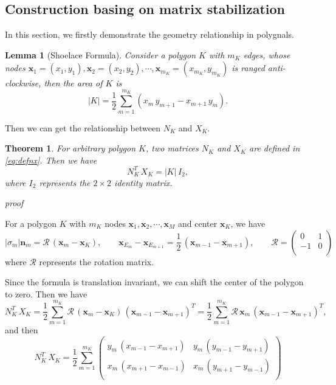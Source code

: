 \documentclass[times,review,preprint,authoryear]{elsarticle}
\newtheorem{theorem}{Theorem}
\newtheorem{lemma}{Lemma}
\newcommand{\bx}{\mathbf{x}}
\newcommand{\bn}{\mathbf{n}}
\begin{document}
\subsection{Construction basing on matrix stabilization}

In this section, we firstly demonstrate the geometry relationship in polygnals.

\begin{lemma}[Shoelace Formula]\label{lemma:K}
Consider a polygon $K$ with $m_K$ edges, whose nodes $\bx_1 = (x_1, y_1), \bx_2 = (x_2, y_2), \cdots, \bx_{m_K} = (x_{m_K}, y_{m_K})$ is ranged anti-clockwise, then the area of $K$ is
\begin{equation}
|K| = \frac12 \sum_{m=1}^{m_K} (x_{m} \, y_{m+1} - x_{m+1} \, y_{m}).
\end{equation}
\end{lemma}

Then we can get the relationship between $N_K$ and $X_K$.

\begin{theorem}
For arbitrary polygon $K$, two matrices $N_K$ and $X_K$ are defined in \cref{eq:defnx}. Then we have
\begin{equation}
N_K^T \, X_K = |K| \, I_2,
\end{equation}
where $I_2$ represents the $2 \times 2$ identity matrix.
\end{theorem}

\emph{proof}

For a polygon $K$ with $m_K$ nodes $\bx_1, \bx_2, \cdots, \bx_M$ and center $\bx_K$, we have
\begin{equation*}
|\sigma_m| \bn_m = \mathcal{R} \, (\bx_m - \bx_K), \qquad
\bx_{E_m} - \bx_{E_{m+1}} = \frac12 \, (\bx_{m-1} - \bx_{m+1}), \qquad
\mathcal{R} = \left(\begin{matrix}
0 & 1 \\
-1 & 0 \\
\end{matrix}\right)
\end{equation*}
where $\mathcal{R}$ represents the rotation matrix.

Since the formula is translation invariant, we can shift the center of the polygon to zero. Then we have
\begin{equation*}
N_K^T \, X_K = \frac12 \sum_{m=1}^{m_K} \mathcal{R} \, (\bx_m - \bx_K) \, (\bx_{m-1} - \bx_{m+1})^T = \frac12 \sum_{m=1}^{m_K} \mathcal{R} \, \bx_m \, (\bx_{m-1} - \bx_{m+1})^T,
\end{equation*}
and then
\begin{equation*}
N_K^T \, X_K = \frac12 \sum_{m=1}^{m_K} \left(\begin{matrix}
y_{m} \, (x_{m-1} - x_{m+1}) & y_{m} \, (y_{m-1} - y_{m+1}) \\
x_{m} \, (x_{m+1} - x_{m-1}) & x_{m} \, (y_{m+1} - y_{m-1}) \\
\end{matrix}\right)
\end{equation*}
\end{document}
